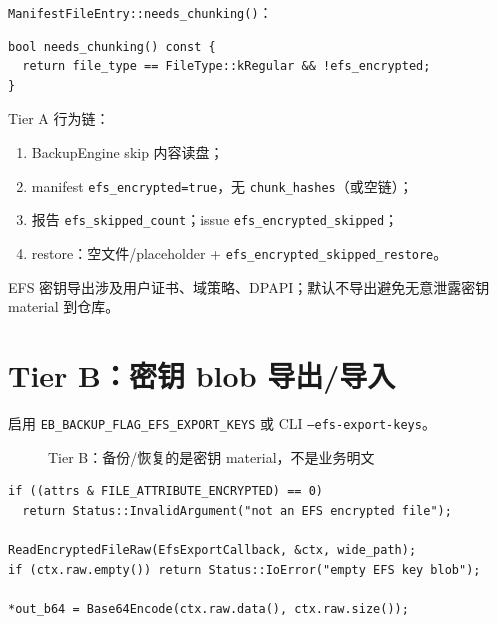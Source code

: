 \texttt{ManifestFileEntry::needs\_chunking()}：

\begin{lstlisting}[caption={EFS 不 chunk (manifest.h)}]
bool needs_chunking() const {
  return file_type == FileType::kRegular && !efs_encrypted;
}
\end{lstlisting}

Tier A 行为链：
\begin{enumerate}[nosep]
  \item BackupEngine skip 内容读盘；
  \item manifest \texttt{efs\_encrypted=true}，无 \texttt{chunk\_hashes}（或空链）；
  \item 报告 \texttt{efs\_skipped\_count}；issue \texttt{efs\_encrypted\_skipped}；
  \item restore：空文件/placeholder + \texttt{efs\_encrypted\_skipped\_restore}。
\end{enumerate}

\begin{designbox}
EFS 密钥导出涉及用户证书、域策略、DPAPI；默认不导出避免无意泄露密钥 material 到仓库。
\end{designbox}

\section{Tier B：密钥 blob 导出/导入}

启用 \texttt{EB\_BACKUP\_FLAG\_EFS\_EXPORT\_KEYS} 或 CLI \texttt{--efs-export-keys}。

\begin{figure}[htbp]
\centering
{}
\caption{Tier B：备份/恢复的是密钥 material，不是业务明文}
\end{figure}

\begin{lstlisting}[caption={ExportEfsKeyBlob (efs\_key.cc)}]
if ((attrs & FILE_ATTRIBUTE_ENCRYPTED) == 0)
  return Status::InvalidArgument("not an EFS encrypted file");

ReadEncryptedFileRaw(EfsExportCallback, &ctx, wide_path);
if (ctx.raw.empty()) return Status::IoError("empty EFS key blob");

*out_b64 = Base64Encode(ctx.raw.data(), ctx.raw.size());
\end{lstlisting}

